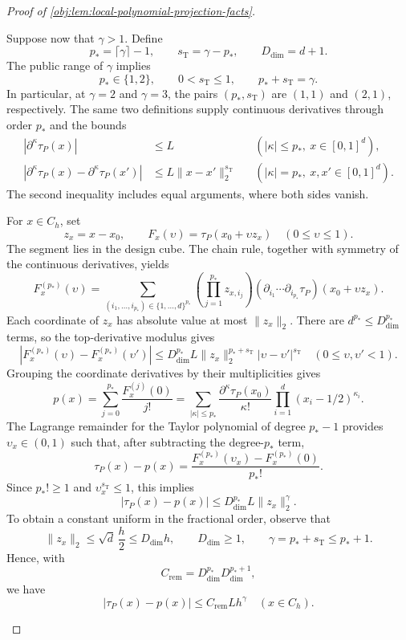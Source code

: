 \documentclass[11pt]{article}
\begin{document}
\begin{proof}[Proof of \cref{obj:lem:local-polynomial-projection-facts}]
\begin{enumerate}
Suppose now that \(\gamma>1\). Define
\[
p_*=\lceil\gamma\rceil-1,\qquad
s_{\mathrm T}=\gamma-p_*,
\qquad
D_{\mathrm{dim}}=d+1.
\]
The public range of \(\gamma\) implies
\[
p_*\in\{1,2\},\qquad
0<s_{\mathrm T}\le1,\qquad
p_*+s_{\mathrm T}=\gamma.
\]
In particular, at \(\gamma=2\) and \(\gamma=3\), the pairs
\((p_*,s_{\mathrm T})\) are \((1,1)\) and \((2,1)\), respectively.
The same two definitions supply continuous derivatives through order \(p_*\) and the bounds
\[
\begin{aligned}
|\partial^\kappa\tau_P(x)|&\le L
&&(|\kappa|\le p_*,\ x\in[0,1]^d),\\
|\partial^\kappa\tau_P(x)-\partial^\kappa\tau_P(x')|
 &\le L\|x-x'\|_2^{s_{\mathrm T}}
&&(|\kappa|=p_*,\ x,x'\in[0,1]^d).
\end{aligned}
\]
The second inequality includes equal arguments, where both sides vanish.

For \(x\in C_h\), set
\[
z_x=x-x_0,\qquad
F_x(\upsilon)=\tau_P(x_0+\upsilon z_x)
\quad(0\le\upsilon\le1).
\]
The segment lies in the design cube. The chain rule, together with symmetry of the continuous derivatives, yields
\[
F_x^{(p_*)}(\upsilon)
 =
 \sum_{(i_1,\ldots,i_{p_*})\in\{1,\ldots,d\}^{p_*}}
 \left(\prod_{j=1}^{p_*}z_{x,i_j}\right)
 (\partial_{i_1}\cdots\partial_{i_{p_*}}\tau_P)
 (x_0+\upsilon z_x).
\]
Each coordinate of \(z_x\) has absolute value at most \(\|z_x\|_2\).
There are \(d^{p_*}\le D_{\mathrm{dim}}^{p_*}\) terms, so the top-derivative modulus gives
\[
\left|F_x^{(p_*)}(\upsilon)-F_x^{(p_*)}(\upsilon')\right|
 \le D_{\mathrm{dim}}^{p_*}L
       \|z_x\|_2^{p_*+s_{\mathrm T}}
       |\upsilon-\upsilon'|^{s_{\mathrm T}}
\quad(0\le\upsilon,\upsilon'<1).
\]
Grouping the coordinate derivatives by their multiplicities gives
\[
p(x)
 =\sum_{j=0}^{p_*}\frac{F_x^{(j)}(0)}{j!}
 =\sum_{|\kappa|\le p_*}
   \frac{\partial^\kappa\tau_P(x_0)}{\kappa!}
   \prod_{i=1}^d(x_i-1/2)^{\kappa_i}.
\]
The Lagrange remainder for the Taylor polynomial of degree \(p_*-1\)
provides \(\upsilon_x\in(0,1)\) such that, after subtracting the degree-\(p_*\) term,
\[
\tau_P(x)-p(x)
 =\frac{F_x^{(p_*)}(\upsilon_x)-F_x^{(p_*)}(0)}{p_*!}.
\]
Since \(p_*!\ge1\) and \(\upsilon_x^{s_{\mathrm T}}\le1\), this implies
\[
|\tau_P(x)-p(x)|
 \le D_{\mathrm{dim}}^{p_*}L\|z_x\|_2^\gamma.
\]
To obtain a constant uniform in the fractional order, observe that
\[
\|z_x\|_2\le\sqrt d\,\frac h2\le D_{\mathrm{dim}}h,
\qquad
D_{\mathrm{dim}}\ge1,
\qquad
\gamma=p_*+s_{\mathrm T}\le p_*+1.
\]
Hence, with
\[
C_{\mathrm{rem}}
 =D_{\mathrm{dim}}^{p_*}D_{\mathrm{dim}}^{p_*+1},
\]
we have
\[
|\tau_P(x)-p(x)|
 \le C_{\mathrm{rem}}Lh^\gamma
 \quad(x\in C_h).
\]


\end{enumerate}
\end{proof}
\end{document}
